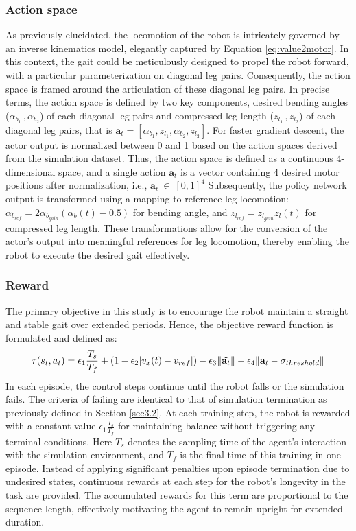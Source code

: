\subsubsection{Action space}
\label{Sec:as}
As previously elucidated, the locomotion of the robot is intricately governed by an inverse kinematics model, elegantly captured by Equation \ref{eq:value2motor}. In this context, the gait could be meticulously designed to propel the robot forward, with a particular parameterization on diagonal leg pairs. Consequently, the action space is framed around the articulation of these diagonal leg pairs. In precise terms, the action space is defined by two key components, desired bending angles ($\alpha_{b_1}\,,\alpha_{b_2}$) of each diagonal leg pairs and compressed leg length ($z_{l_1}\,,z_{l_2}$) of each diagonal leg pairs, that is $\mathbf{a}_{t} = [\alpha_{b_1}, z_{l_1}, \alpha_{b_2}, z_{l_2}]$. For faster gradient descent, the actor output is normalized between 0 and 1 based on the action spaces derived from the simulation dataset. Thus, the action space is defined as a continuous 4-dimensional space, and a single action $\mathbf{a}_t$ is a vector containing 4 desired motor positions after normalization, i.e., $\mathbf{a}_t \:\in\:[0,1]^4$ Subsequently, the policy network output is transformed using a mapping to reference leg locomotion: $\alpha_{b_{ref}} = 2\alpha_{b_{gain}}(\alpha_b(t) -0.5)$ for bending angle, and $z_{l_{ref}} = z_{l_{gain}}z_l(t)$ for compressed leg length. These transformations allow for the conversion of the actor's output into meaningful references for leg locomotion, thereby enabling the robot to execute the desired gait effectively.
\subsubsection{Reward}
The primary objective in this study is to encourage the robot maintain a straight and stable gait over extended periods. Hence, the objective reward function is formulated and defined as: 
\begin{equation}
    r(s_t,a_t) = \epsilon_1\frac{T_s}{T_f} + (1-\epsilon_2|v_x(t)-v_{ref}|)-\epsilon_3\lVert\Ddot{\mathbf{a}_t}\rVert - \epsilon_4\lVert\mathbf{a}_t-\mathbf{\sigma}_{threshold}\rVert
    \label{eq:reward}
\end{equation}
In each episode, the control steps continue until the robot falls or the simulation fails. The criteria of failing are identical to that of simulation termination as previously defined in Section \ref{sec3.2}. At each training step, the robot is rewarded with a constant value $\epsilon_1\frac{T_s}{T_f}$ for maintaining balance without triggering any terminal conditions. Here $T_s$ denotes the sampling time of the agent's interaction with the simulation environment, and $T_f$ is the final time of this training in one episode. Instead of applying significant penalties upon episode termination due to undesired states, continuous rewards at each step for the robot's longevity in the task are provided. The accumulated rewards for this term are proportional to the sequence length, effectively motivating the agent to remain upright for extended duration. 

